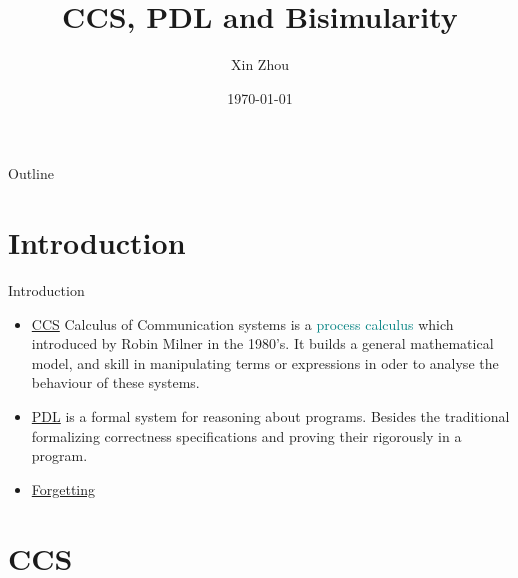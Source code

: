 \title{CCS, PDL and Bisimularity}

\author{Xin Zhou}


\date{\today}%


\frame{\titlepage}
\begin{frame}{Outline}
\tableofcontents[hideallsubsections]
\end{frame}



\section{Introduction}

\begin{frame}[allowframebreaks]{Introduction}
  \begin{itemize}
    \item \underline{CCS} Calculus of Communication systems is a \textcolor{teal}{process calculus} which introduced by Robin Milner in the 1980's\cite{DBLP:books/daglib/0067019}. It builds a general mathematical model, and skill in manipulating terms or expressions in oder to analyse the behaviour of these systems.
    

    \item \underline{PDL} is a formal system for reasoning about programs. Besides the traditional formalizing correctness specifications and proving their rigorously in a program.

    \item \underline{Forgetting} 
  \end{itemize}
\end{frame}

\section{CCS}



